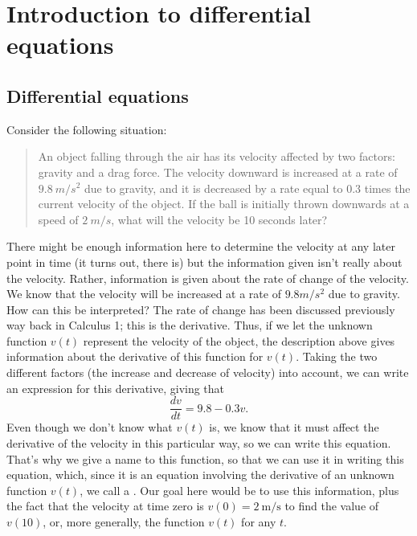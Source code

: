 \section{Introduction to differential equations}
\label{introde:section}




\subsection{Differential equations}

Consider the following situation:
\begin{quote}
An object falling through the air has its velocity affected by two factors: gravity and a drag force. The velocity downward is increased at a rate of $9.8\ m/s^2$ due to gravity, and it is decreased by a rate equal to $0.3$ times the current velocity of the object. If the ball is initially thrown downwards at a speed of $2\ m/s$, what will the velocity be 10 seconds later?
\end{quote}

There might be enough information here to determine the velocity at any later point in time (it turns out, there is) but the information given isn't really about the velocity. Rather, information is given about the rate of change of the velocity. We know that the velocity will be increased at a rate of $9.8 m/s^2$ due to gravity. How can this be interpreted? The rate of change has been discussed previously way back in Calculus 1; this is the derivative. Thus, if we let the unknown function $v(t)$ represent the velocity of the object, the description above gives information about the derivative of this function for $v(t)$. Taking the two different factors (the increase and decrease of velocity) into account, we can write an expression for this derivative, giving that
\begin{equation*}
\frac{dv}{dt} = 9.8 - 0.3v.
\end{equation*}
Even though we don't know what $v(t)$ is, we know that it must affect the derivative of the velocity in this particular way, so we can write this equation. That's why we give a name to this function, so that we can use it in writing this equation, which, since it is an equation involving the derivative of an unknown function $v(t)$, we call a . Our goal here would be to use this information, plus the fact that the velocity at time zero is $v(0) = 2\ \text{m/s}$ to find the value of $v(10)$, or, more generally, the function $v(t)$ for any $t$. 

